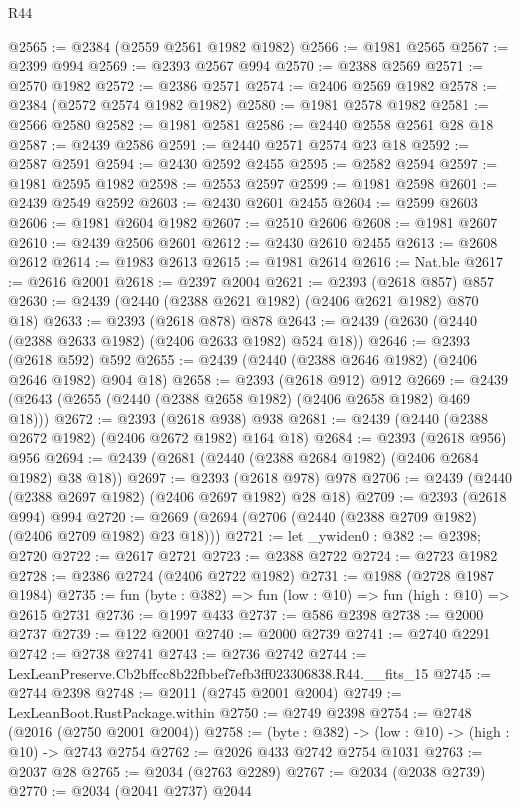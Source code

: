 \begin{lexlean}{R44}
\begin{coremodule}
@2565 := @2384 (@2559 @2561 @1982 @1982)
@2566 := @1981 @2565
@2567 := @2399 @994
@2569 := @2393 @2567 @994
@2570 := @2388 @2569
@2571 := @2570 @1982
@2572 := @2386 @2571
@2574 := @2406 @2569 @1982
@2578 := @2384 (@2572 @2574 @1982 @1982)
@2580 := @1981 @2578 @1982
@2581 := @2566 @2580
@2582 := @1981 @2581
@2586 := @2440 @2558 @2561 @28 @18
@2587 := @2439 @2586
@2591 := @2440 @2571 @2574 @23 @18
@2592 := @2587 @2591
@2594 := @2430 @2592 @2455
@2595 := @2582 @2594
@2597 := @1981 @2595 @1982
@2598 := @2553 @2597
@2599 := @1981 @2598
@2601 := @2439 @2549 @2592
@2603 := @2430 @2601 @2455
@2604 := @2599 @2603
@2606 := @1981 @2604 @1982
@2607 := @2510 @2606
@2608 := @1981 @2607
@2610 := @2439 @2506 @2601
@2612 := @2430 @2610 @2455
@2613 := @2608 @2612
@2614 := @1983 @2613
@2615 := @1981 @2614
@2616 := Nat.ble
@2617 := @2616 @2001
@2618 := @2397 @2004
@2621 := @2393 (@2618 @857) @857
@2630 := @2439 (@2440 (@2388 @2621 @1982) (@2406 @2621 @1982) @870 @18)
@2633 := @2393 (@2618 @878) @878
@2643 := @2439 (@2630 (@2440 (@2388 @2633 @1982) (@2406 @2633 @1982) @524 @18))
@2646 := @2393 (@2618 @592) @592
@2655 := @2439 (@2440 (@2388 @2646 @1982) (@2406 @2646 @1982) @904 @18)
@2658 := @2393 (@2618 @912) @912
@2669 := @2439 (@2643 (@2655 (@2440 (@2388 @2658 @1982) (@2406 @2658 @1982) @469 @18)))
@2672 := @2393 (@2618 @938) @938
@2681 := @2439 (@2440 (@2388 @2672 @1982) (@2406 @2672 @1982) @164 @18)
@2684 := @2393 (@2618 @956) @956
@2694 := @2439 (@2681 (@2440 (@2388 @2684 @1982) (@2406 @2684 @1982) @38 @18))
@2697 := @2393 (@2618 @978) @978
@2706 := @2439 (@2440 (@2388 @2697 @1982) (@2406 @2697 @1982) @28 @18)
@2709 := @2393 (@2618 @994) @994
@2720 := @2669 (@2694 (@2706 (@2440 (@2388 @2709 @1982) (@2406 @2709 @1982) @23 @18)))
@2721 := let _ywiden0 : @382 := @2398; @2720
@2722 := @2617 @2721
@2723 := @2388 @2722
@2724 := @2723 @1982
@2728 := @2386 @2724 (@2406 @2722 @1982)
@2731 := @1988 (@2728 @1987 @1984)
@2735 := fun (byte : @382) => fun (low : @10) => fun (high : @10) => @2615 @2731
@2736 := @1997 @433
@2737 := @586 @2398
@2738 := @2000 @2737
@2739 := @122 @2001
@2740 := @2000 @2739
@2741 := @2740 @2291
@2742 := @2738 @2741
@2743 := @2736 @2742
@2744 := LexLeanPreserve.Cb2bffcc8b22fbbef7efb3ff023306838.R44.__fits_15
@2745 := @2744 @2398
@2748 := @2011 (@2745 @2001 @2004)
@2749 := LexLeanBoot.RustPackage.within
@2750 := @2749 @2398
@2754 := @2748 (@2016 (@2750 @2001 @2004))
@2758 := (byte : @382) -> (low : @10) -> (high : @10) -> @2743 @2754
@2762 := @2026 @433 @2742 @2754 @1031
@2763 := @2037 @28
@2765 := @2034 (@2763 @2289)
@2767 := @2034 (@2038 @2739)
@2770 := @2034 (@2041 @2737) @2044

\end{coremodule}
\end{lexlean}
